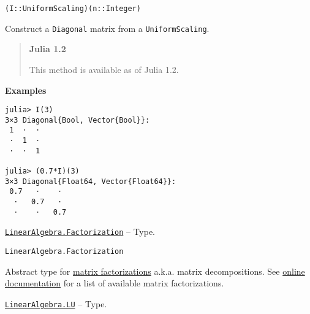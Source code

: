 \begin{adjustwidth}{2em}{0pt}


\begin{verbatim}
(I::UniformScaling)(n::Integer)
\end{verbatim}

Construct a \texttt{Diagonal} matrix from a \texttt{UniformScaling}.

\begin{quote}
\textbf{Julia 1.2}

This method is available as of Julia 1.2.

\end{quote}
\textbf{Examples}


\begin{verbatim}
julia> I(3)
3×3 Diagonal{Bool, Vector{Bool}}:
 1  ⋅  ⋅
 ⋅  1  ⋅
 ⋅  ⋅  1

julia> (0.7*I)(3)
3×3 Diagonal{Float64, Vector{Float64}}:
 0.7   ⋅    ⋅
  ⋅   0.7   ⋅
  ⋅    ⋅   0.7
\end{verbatim}



\end{adjustwidth}
\hypertarget{3230130194560201438}{}
\hyperlink{3230130194560201438}{\texttt{LinearAlgebra.Factorization}}  -- {Type.}

\begin{adjustwidth}{2em}{0pt}


\begin{verbatim}
LinearAlgebra.Factorization
\end{verbatim}

Abstract type for \href{https://en.wikipedia.org/wiki/Matrix\_decomposition}{matrix factorizations} a.k.a. matrix decompositions. See \hyperlink{14017178414387426770}{online documentation} for a list of available matrix factorizations.



\end{adjustwidth}
\hypertarget{9094854913402033490}{}
\hyperlink{9094854913402033490}{\texttt{LinearAlgebra.LU}}  -- {Type.}

